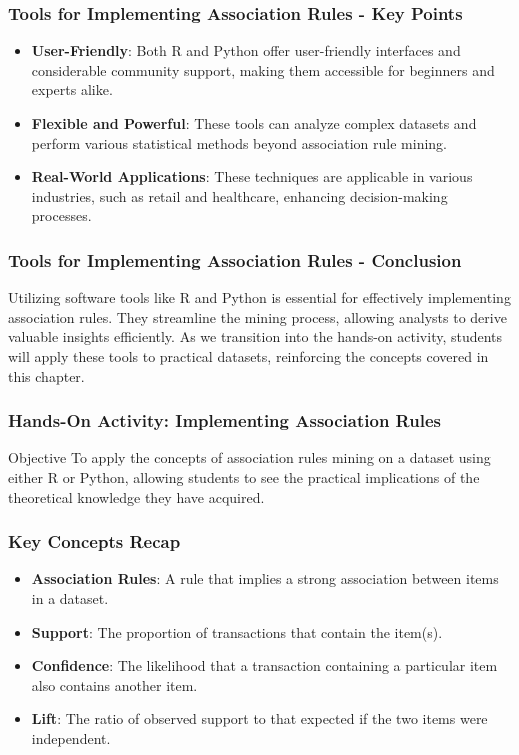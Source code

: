 \documentclass[aspectratio=169]{beamer}
\begin{document}
\begin{frame}
    \frametitle{Tools for Implementing Association Rules - Key Points}
    \begin{itemize}
        \item \textbf{User-Friendly}: Both R and Python offer user-friendly interfaces and considerable community support, making them accessible for beginners and experts alike.
        \item \textbf{Flexible and Powerful}: These tools can analyze complex datasets and perform various statistical methods beyond association rule mining.
        \item \textbf{Real-World Applications}: These techniques are applicable in various industries, such as retail and healthcare, enhancing decision-making processes.
    \end{itemize}
\end{frame}

\begin{frame}
    \frametitle{Tools for Implementing Association Rules - Conclusion}
    Utilizing software tools like R and Python is essential for effectively implementing association rules. 
    They streamline the mining process, allowing analysts to derive valuable insights efficiently. 
    As we transition into the hands-on activity, students will apply these tools to practical datasets, reinforcing the concepts covered in this chapter.
\end{frame}

\begin{frame}[fragile]
    \frametitle{Hands-On Activity: Implementing Association Rules}
    \begin{block}{Objective}
        To apply the concepts of association rules mining on a dataset using either R or Python, allowing students to see the practical implications of the theoretical knowledge they have acquired.
    \end{block}
\end{frame}

\begin{frame}[fragile]
    \frametitle{Key Concepts Recap}
    \begin{itemize}
        \item \textbf{Association Rules}: A rule that implies a strong association between items in a dataset.
        \item \textbf{Support}: The proportion of transactions that contain the item(s).
        \item \textbf{Confidence}: The likelihood that a transaction containing a particular item also contains another item.
        \item \textbf{Lift}: The ratio of observed support to that expected if the two items were independent.
    \end{itemize}
\end{frame}
\end{document}
